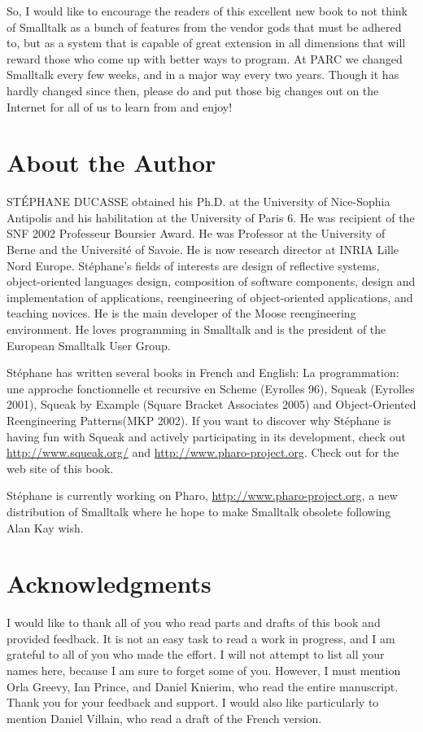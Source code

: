 \documentclass[a4paper,10pt,twoside]{book}
\begin{document}
So, I would like to encourage the readers of this excellent new book to not think of 
Smalltalk as a bunch of features from the vendor gods that must be adhered to, but as a system that is capable of great extension in all dimensions that will reward those who come up 
with better ways to program. At PARC we changed Smalltalk every few weeks, and in a major way every two years. Though it has hardly changed since then, please do and put those big 
changes out on the Internet for all of us to learn from and enjoy! 

\chapter*{About the Author}

ST\'EPHANE DUCASSE obtained his Ph.D. at the University of Nice-Sophia Antipolis and his habilitation at the University of Paris 6. He was recipient of the SNF 2002 Professeur Boursier 
Award. He was Professor at the University of Berne and the Université of Savoie. He is now research director at INRIA Lille Nord Europe. 
Stéphane’s fields of interests are design of reflective systems, object-oriented languages design, composition of software components, design and implementation of applications, 
reengineering of object-oriented applications, and teaching novices. He is the main developer of the Moose reengineering environment. He loves programming in Smalltalk and is the president of the European Smalltalk User Group. 

Stéphane has written several books in French and English: La programmation: une 
approche fonctionnelle et recursive en Scheme (Eyrolles 96), Squeak (Eyrolles 2001), Squeak by Example (Square Bracket Associates 2005) and 
Object-Oriented Reengineering Patterns(MKP 2002). 
If you want to discover why Stéphane is having fun with Squeak and actively participating in its development, check out \url{http://www.squeak.org/} and \url{http://www.pharo-project.org}.  Check out  for the web site of this book. 

St\'ephane is currently working on Pharo, \url{http://www.pharo-project.org},  a new distribution of Smalltalk where he hope to make Smalltalk obsolete following Alan Kay wish. 

\chapter*{Acknowledgments}
I would like to thank all of you who read parts and drafts of this book and provided feedback. 
It is not an easy task to read a work in progress, and I am grateful to all of you who made the 
effort. I will not attempt to list all your names here, because I am sure to forget some of you. 
However, I must mention Orla Greevy, Ian Prince, and Daniel Knierim, who read the entire 
manuscript. Thank you for your feedback and support. I would also like particularly to mention 
Daniel Villain, who read a draft of the French version. 
\end{document}
